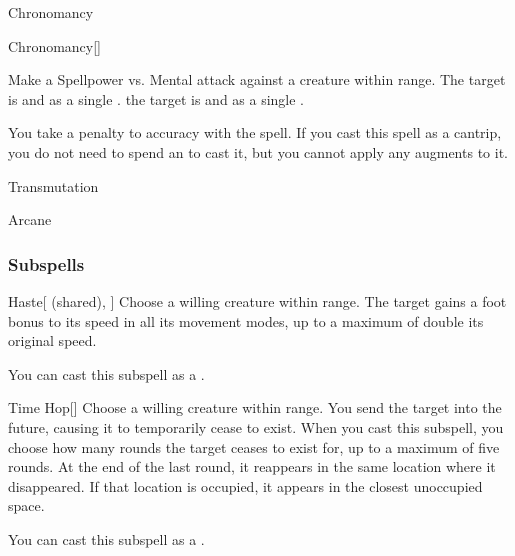 \newpage
\begin{spellsection}{Chronomancy}

\begin{spellheader}
\end{spellheader}


\begin{ability}{Chronomancy}[]

Make a Spellpower vs. Mental attack against a creature within \rngmed range.
\hit The target is  and  as a single .
\crit the target is  and  as a single .

\end{ability}



You take a  penalty to accuracy with the spell.
If you cast this spell as a cantrip,
you do not need to spend an  to cast it,
but you cannot apply any augments to it.


 Transmutation

 Arcane
\end{spellsection}


\subsubsection{Subspells}


\begin{ability}[\nth{2}]{Haste}[ (shared), ]
Choose a willing creature within \rngmed range.
The target gains a  foot bonus to its speed in all its movement modes, up to a maximum of double its original speed.

You can cast this subspell as a .
\end{ability}
\vspace{0.25em}


\begin{ability}[\nth{2}]{Time Hop}[]
Choose a willing creature within \rngmed range.
You send the target into the future, causing it to temporarily cease to exist.
When you cast this subspell, you choose how many rounds the target ceases to exist for, up to a maximum of five rounds.
At the end of the last round, it reappears in the same location where it disappeared.
If that location is occupied, it appears in the closest unoccupied space.

You can cast this subspell as a .
\end{ability}
\vspace{0.25em}


